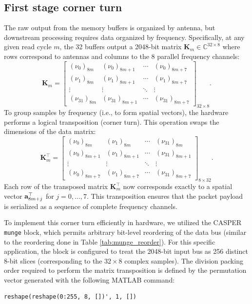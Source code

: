 \subsection{First stage corner turn}
\label{sec:corner_turn}
The raw output from the memory buffers is organized by antenna, but downstream processing requires data organized by frequency. Specifically, at any given read cycle $m$, the 32 buffers output a 2048-bit matrix $\mathbf{K}_m \in \mathbb{C}^{32 \times 8}$ where rows correspond to antennas and columns to the 8 parallel frequency channels:
\begin{equation}
	\mathbf{K}_m = \begin{bmatrix}
		(\nu_0)_{8m} & (\nu_0)_{8m+1} & \cdots & (\nu_0)_{8m+7} \\
		(\nu_1)_{8m} & (\nu_1)_{8m+1} & \cdots & (\nu_1)_{8m+7} \\
		\vdots & \vdots & \ddots & \vdots \\
		(\nu_{31})_{8m} & (\nu_{31})_{8m+1} & \cdots & (\nu_{31})_{8m+7}
	\end{bmatrix}_{32 \times 8}.
\end{equation}
To group samples by frequency (i.e., to form spatial vectors), the hardware performs a logical transposition (corner turn). This operation swaps the dimensions of the data matrix:
\begin{equation}
	\mathbf{K}_m^\top = \begin{bmatrix}
		(\nu_0)_{8m} & (\nu_1)_{8m} & \cdots & (\nu_{31})_{8m} \\
		(\nu_0)_{8m+1} & (\nu_1)_{8m+1} & \cdots & (\nu_{31})_{8m+1} \\
		\vdots & \vdots & \ddots & \vdots \\
		(\nu_0)_{8m+7} & (\nu_1)_{8m+7} & \cdots & (\nu_{31})_{8m+7}
	\end{bmatrix}_{8 \times 32}.
	\label{eq:corner_turn}
\end{equation}
Each row of the transposed matrix $\mathbf{K}_m^\top$ now corresponds exactly to a spatial vector $\mathbf{a}_{8m+j}^\top$ for $j=0,\dots,7$. This transposition ensures that the packet payload is serialized as a sequence of complete frequency channels.

To implement this corner turn efficiently in hardware, we utilized the CASPER \texttt{munge} block, which permits arbitrary bit-level reordering of the data bus (similar to the reordering done in Table \ref{tab:munge_reorder}). For this specific application, the block is configured to treat the 2048-bit input bus as 256 distinct 8-bit slices (corresponding to the $32 \times 8$ complex samples). The division packing order required to perform the matrix transposition is defined by the permutation vector generated with the following MATLAB command:
\begin{lstlisting}[style=Matlab-editor, basicstyle=\small\ttfamily, caption={MATLAB code to generate the permutation vector for the corner turn operation.}]
	reshape(reshape(0:255, 8, [])', 1, [])
\end{lstlisting}



